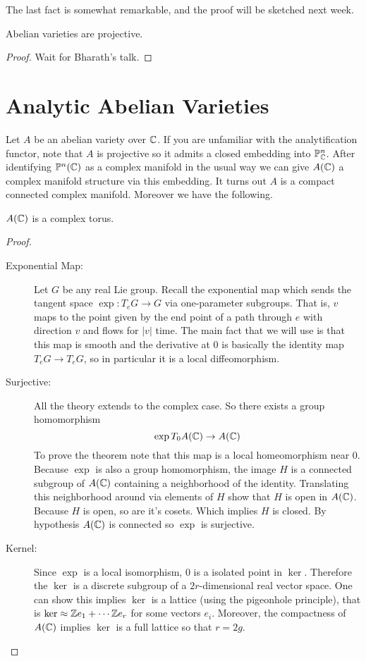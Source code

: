 \documentclass[11pt]{article}
\begin{document}
The last fact is somewhat remarkable, and the proof will be sketched next week.

\begin{prop}
	Abelian varieties are projective.
\end{prop}
\begin{proof}
	Wait for Bharath's talk.
\end{proof}

\section{Analytic Abelian Varieties}

Let $A$ be an abelian variety over $\mathbb{C}$. If you are unfamiliar with the analytification functor, note that $A$ is projective so it admits a closed embedding into $\mathbb{P}^n_{\mathbb{C}}$. After identifying $\mathbb{P}^n(\mathbb{C})$ as a complex manifold in the usual way we can give $A(\mathbb{C})$ a complex manifold structure via this embedding. It turns out $A$ is a compact connected complex manifold. Moreover we have the following.

\begin{thm}\label{av_cmplx_tori}
	$A(\mathbb{C})$ is a complex torus.
\end{thm}
\begin{proof}
\hfill
\begin{description}
	\item[Exponential Map:]
		Let $G$ be any real Lie group. Recall the exponential map which sends the tangent space $\exp: T_eG \to G$ via one-parameter subgroups. That is, $v$ maps to the point given by the end point of a path through $e$ with direction $v$ and flows for $|v|$ time. The main fact that we will use is that this map is smooth and the derivative at $0$ is basically the identity map $T_eG \to T_eG$, so in particular it is a local diffeomorphism.
	\item[Surjective:]
		All the theory extends to the complex case. So there exists a group homomorphism
		$$
		\exp T_0A(\mathbb{C}) \to A(\mathbb{C})
		$$
		To prove the theorem note that this map is a local homeomorphism near $0$. Because $\exp$ is also a group homomorphism, the image $H$ is a connected subgroup of $A(\mathbb{C})$ containing a neighborhood of the identity. Translating this neighborhood around via elements of $H$ show that $H$ is open in $A(\mathbb{C})$. Because $H$ is open, so are it's cosets. Which implies $H$ is closed. By hypothesis $A(\mathbb{C})$ is connected so $\exp$ is surjective.
	\item[Kernel:]
		Since $\exp$ is a local isomorphism, $0$ is a isolated point in $\ker$. Therefore the $\ker$ is a discrete subgroup of a $2r$-dimensional real vector space. One can show this implies $\ker$ is a lattice (using the pigeonhole principle), that is $\ker \approx \mathbb{Z} e_1 + \cdots \mathbb{Z} e_r$ for some vectors $e_i$. Moreover, the compactness of $A(\mathbb{C})$ implies $\ker$ is a full lattice so that $r = 2g$.
\end{description}
\end{proof}
\end{document}
